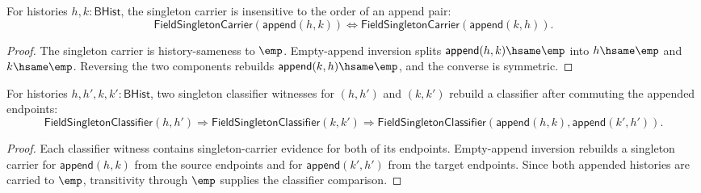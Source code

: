 \begin{theorem}
\label{thm:field-singleton-carrier-append-comm}
For histories $h,k:\mathsf{BHist}$, the singleton carrier is insensitive to
the order of an append pair:
$$
\mathsf{FieldSingletonCarrier}(\mathsf{append}(h,k))
\Longleftrightarrow
\mathsf{FieldSingletonCarrier}(\mathsf{append}(k,h)).
$$
\end{theorem}
\begin{proof}
The singleton carrier is history-sameness to $\emp$. Empty-append inversion
splits $\mathsf{append}(h,k)\hsame\emp$ into $h\hsame\emp$ and
$k\hsame\emp$. Reversing the two components rebuilds
$\mathsf{append}(k,h)\hsame\emp$, and the converse is symmetric.
\end{proof}

\begin{theorem}
\label{thm:field-singleton-classifier-append-comm-congruence}
For histories $h,h',k,k':\mathsf{BHist}$, two singleton classifier witnesses
for $(h,h')$ and $(k,k')$ rebuild a classifier after commuting the appended
endpoints:
$$
\mathsf{FieldSingletonClassifier}(h,h')\Rightarrow
\mathsf{FieldSingletonClassifier}(k,k')\Rightarrow
\mathsf{FieldSingletonClassifier}(\mathsf{append}(h,k),\mathsf{append}(k',h')).
$$
\end{theorem}
\begin{proof}
Each classifier witness contains singleton-carrier evidence for both of its
endpoints. Empty-append inversion rebuilds a singleton carrier for
$\mathsf{append}(h,k)$ from the source endpoints and for
$\mathsf{append}(k',h')$ from the target endpoints. Since both appended
histories are carried to $\emp$, transitivity through $\emp$ supplies the
classifier comparison.
\end{proof}
